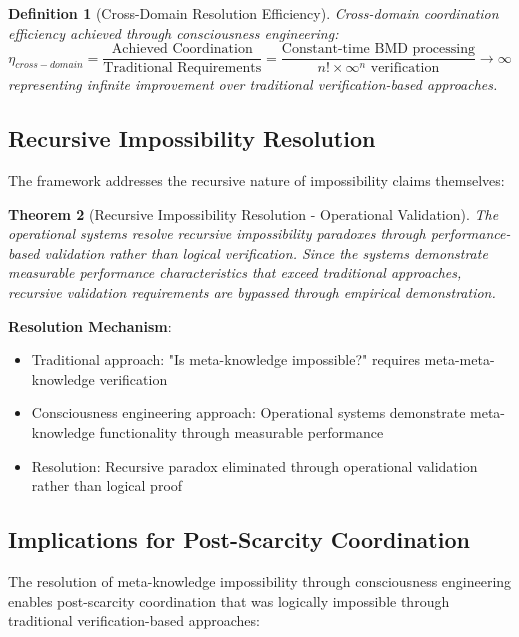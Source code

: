 \documentclass[12pt,a4paper]{article}
\newtheorem{theorem}{Theorem}[section]
\newtheorem{definition}[theorem]{Definition}
\begin{document}
\begin{definition}[Cross-Domain Resolution Efficiency]
Cross-domain coordination efficiency achieved through consciousness engineering:
$$\eta_{cross-domain} = \frac{\text{Achieved Coordination}}{\text{Traditional Requirements}} = \frac{\text{Constant-time BMD processing}}{n! \times \infty^n \text{ verification}} \rightarrow \infty$$
representing infinite improvement over traditional verification-based approaches.
\end{definition}

\subsection{Recursive Impossibility Resolution}

The framework addresses the recursive nature of impossibility claims themselves:

\begin{theorem}[Recursive Impossibility Resolution - Operational Validation]
The operational systems resolve recursive impossibility paradoxes through performance-based validation rather than logical verification. Since the systems demonstrate measurable performance characteristics that exceed traditional approaches, recursive validation requirements are bypassed through empirical demonstration.
\end{theorem}

\textbf{Resolution Mechanism}:
\begin{itemize}
\item Traditional approach: "Is meta-knowledge impossible?" requires meta-meta-knowledge verification
\item Consciousness engineering approach: Operational systems demonstrate meta-knowledge functionality through measurable performance
\item Resolution: Recursive paradox eliminated through operational validation rather than logical proof
\end{itemize}

\subsection{Implications for Post-Scarcity Coordination}

The resolution of meta-knowledge impossibility through consciousness engineering enables post-scarcity coordination that was logically impossible through traditional verification-based approaches:
\end{document}
